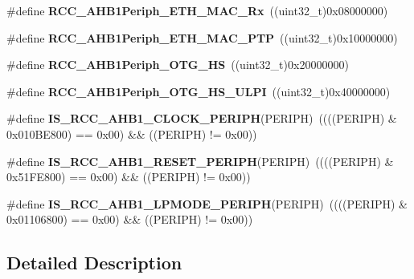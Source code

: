 \begin{DoxyCompactItemize}
\item 
\mbox{\label{group___r_c_c___a_h_b1___peripherals_gacabda9afb562d0cd0888af9dd455dc88}} 
\#define {\bfseries R\+C\+C\+\_\+\+A\+H\+B1\+Periph\+\_\+\+E\+T\+H\+\_\+\+M\+A\+C\+\_\+\+Rx}~((uint32\+\_\+t)0x08000000)
\item 
\mbox{\label{group___r_c_c___a_h_b1___peripherals_ga8a9a214e3a1ff169359ba066a46a2ce8}} 
\#define {\bfseries R\+C\+C\+\_\+\+A\+H\+B1\+Periph\+\_\+\+E\+T\+H\+\_\+\+M\+A\+C\+\_\+\+P\+TP}~((uint32\+\_\+t)0x10000000)
\item 
\mbox{\label{group___r_c_c___a_h_b1___peripherals_ga4280a7954d21649a4496fe85d734e861}} 
\#define {\bfseries R\+C\+C\+\_\+\+A\+H\+B1\+Periph\+\_\+\+O\+T\+G\+\_\+\+HS}~((uint32\+\_\+t)0x20000000)
\item 
\mbox{\label{group___r_c_c___a_h_b1___peripherals_gae23c1fbf41d63d4a122d726cc7051107}} 
\#define {\bfseries R\+C\+C\+\_\+\+A\+H\+B1\+Periph\+\_\+\+O\+T\+G\+\_\+\+H\+S\+\_\+\+U\+L\+PI}~((uint32\+\_\+t)0x40000000)
\item 
\mbox{\label{group___r_c_c___a_h_b1___peripherals_ga647f5c8de61a77084d4d0e6bdd344601}} 
\#define {\bfseries I\+S\+\_\+\+R\+C\+C\+\_\+\+A\+H\+B1\+\_\+\+C\+L\+O\+C\+K\+\_\+\+P\+E\+R\+I\+PH}(P\+E\+R\+I\+PH)~((((P\+E\+R\+I\+PH) \& 0x010\+B\+E800) == 0x00) \&\& ((\+P\+E\+R\+I\+P\+H) != 0x00))
\item 
\mbox{\label{group___r_c_c___a_h_b1___peripherals_gaa9369bfafdf69d7398ae04711bc097d0}} 
\#define {\bfseries I\+S\+\_\+\+R\+C\+C\+\_\+\+A\+H\+B1\+\_\+\+R\+E\+S\+E\+T\+\_\+\+P\+E\+R\+I\+PH}(P\+E\+R\+I\+PH)~((((P\+E\+R\+I\+PH) \& 0x51\+F\+E800) == 0x00) \&\& ((\+P\+E\+R\+I\+P\+H) != 0x00))
\item 
\mbox{\label{group___r_c_c___a_h_b1___peripherals_ga2a192b878ab81e83e804efd5dbd0195b}} 
\#define {\bfseries I\+S\+\_\+\+R\+C\+C\+\_\+\+A\+H\+B1\+\_\+\+L\+P\+M\+O\+D\+E\+\_\+\+P\+E\+R\+I\+PH}(P\+E\+R\+I\+PH)~((((P\+E\+R\+I\+PH) \& 0x01106800) == 0x00) \&\& ((\+P\+E\+R\+I\+P\+H) != 0x00))
\end{DoxyCompactItemize}


\subsection{Detailed Description}
